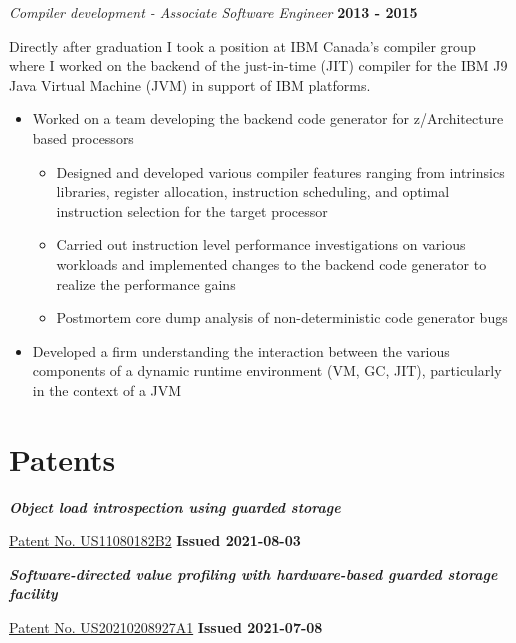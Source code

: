\documentclass[margin,line]{res}
\begin{document}
\begin{resume}
{\em Compiler development - Associate Software Engineer} \hfill {\bf 2013 - 2015}
\vspace{-.12in}

Directly after graduation I took a position at IBM Canada's compiler group where I worked on the backend of the
just-in-time (JIT) compiler for the IBM J9 Java Virtual Machine (JVM) in support of IBM platforms.

\vspace{.10in}

\begin{itemize}
\item Worked on a team developing the backend code generator for z/Architecture based processors
\begin{itemize}
\item Designed and developed various compiler features ranging from intrinsics libraries, register allocation,
instruction scheduling, and optimal instruction selection for the target processor
\item Carried out instruction level performance investigations on various workloads and implemented changes to
the backend code generator to realize the performance gains
\item Postmortem core dump analysis of non-deterministic code generator bugs
\end{itemize}
\item Developed a firm understanding the interaction between the various components of a dynamic runtime 
environment (VM, GC, JIT), particularly in the context of a JVM
\end{itemize}

\section{\sc Patents}

\begin{list}{}{\leftmargin=0cm}

\item {\em \bf Object load introspection using guarded storage}

\href{https://patents.google.com/patent/US11080182B2}{Patent No. US11080182B2} \hfill {\bf Issued 2021-08-03}

\item {\em \bf Software-directed value profiling with hardware-based guarded storage facility}

\href{https://patents.google.com/patent/US20210208927A1}{Patent No. US20210208927A1} \hfill {\bf Issued 2021-07-08}


\end{list}
\end{resume}
\end{document}
